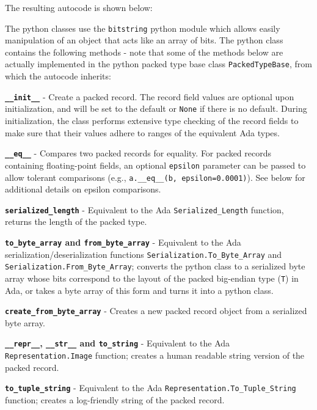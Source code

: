 The resulting autocode is shown below:


The python classes use the \texttt{bitstring} python module which allows easily manipulation of an object that acts like an array of bits. The python class contains the following methods - note that some of the methods below are actually implemented in the python packed type base class \texttt{PackedTypeBase}, from which the autocode inherits:

\vspace{5mm} %
\begin{spaceditemize}
  \item \textbf{\texttt{\_\_init\_\_}} - Create a packed record. The record field values are optional upon initialization, and will be set to the default or \texttt{None} if there is no default. During initialization, the class performs extensive type checking of the record fields to make sure that their values adhere to ranges of the equivalent Ada types.
  \item \textbf{\texttt{\_\_eq\_\_}} - Compares two packed records for equality. For packed records containing floating-point fields, an optional \texttt{epsilon} parameter can be passed to allow tolerant comparisons (e.g., \texttt{a.\_\_eq\_\_(b, epsilon=0.0001)}). See below for additional details on epsilon comparisons.
  \item \textbf{\texttt{serialized\_length}} - Equivalent to the Ada \texttt{Serialized\_Length} function, returns the length of the packed type.
  \item \textbf{\texttt{to\_byte\_array} and \texttt{from\_byte\_array}} - Equivalent to the Ada serialization/deserialization functions \texttt{Serialization.To\_Byte\_Array} and \texttt{Serialization.From\_Byte\_Array}; converts the python class to a serialized byte array whose bits correspond to the layout of the packed big-endian type (\texttt{T}) in Ada, or takes a byte array of this form and turns it into a python class.
  \item \textbf{\texttt{create\_from\_byte\_array}} - Creates a new packed record object from a serialized byte array.
  \item \textbf{\texttt{\_\_repr\_\_}, \texttt{\_\_str\_\_} and \texttt{to\_string}} - Equivalent to the Ada \texttt{Representation.Image} function; creates a human readable string version of the packed record.
  \item \textbf{\texttt{to\_tuple\_string}} - Equivalent to the Ada \texttt{Representation.To\_Tuple\_String} function; creates a log-friendly string of the packed record.
\end{spaceditemize}
\vspace{5mm} %

